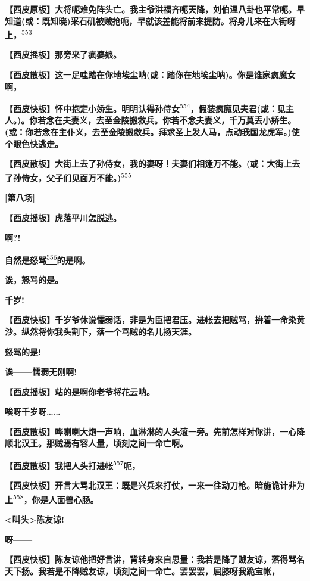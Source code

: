 \textbf{【西皮原板】大将呃难免阵头亡。我主爷洪福齐呃天降，刘伯温八卦也平常呃。早知道(或：既知晓)采石矶被贼抢呃，早就该差能将前来提防。将身儿来在大街呀上，}\protect\hyperlink{fn553}{\textsuperscript{553}}

\textbf{【西皮摇板】那旁来了疯婆娘。}

\textbf{【西皮散板】这一足哇踏在你地埃尘呐(或：踏你在地埃尘呐)。你是谁家疯魔女啊，}

\textbf{【西皮快板】怀中抱定小娇生。明明认得孙侍女}\protect\hyperlink{fn554}{\textsuperscript{554}}\textbf{，假装疯魔见夫君(或：见主人。)。你若念在夫妻义，去至金陵搬救兵。你若不念夫妻义，千万莫丢小娇生。(或：你若念在主仆义，去至金陵搬救兵。拜求圣上发人马，点动我国龙虎军。)使个眼色快逃走。}

\textbf{【西皮散板】大街上去了孙侍女，我的妻呀！夫妻们相逢万不能。(或：大街上去了孙侍女，父子们见面万不能。)}\protect\hyperlink{fn555}{\textsuperscript{555}}

\textbf{{[}第八场{]}}

\textbf{【西皮摇板】虎落平川怎脱逃。}

\textbf{啊?!}

\textbf{自然是怒骂}\protect\hyperlink{fn556}{\textsuperscript{556}}\textbf{的是啊。}

\textbf{诶，怒骂的是。}

\textbf{千岁!}

\textbf{【西皮快板】千岁爷休说懦弱话，非是为臣把君压。进帐去把贼骂，拚着一命染黄沙。纵然将你我头割下，落一个骂贼的名儿扬天涯。}

\textbf{怒骂的是!}

\textbf{诶------懦弱无刚啊!}

\textbf{【西皮摇板】站的是啊你老爷将花云呐。}

\textbf{唉呀千岁呀\ldots{}\ldots{}}

\textbf{【西皮散板】哗喇喇大炮一声响，血淋淋的人头滚一旁。先前怎样对你讲，一心降顺北汉王。那贼焉有容人量，顷刻之间一命亡啊。}

\textbf{【西皮散板】我把人头打进帐}\protect\hyperlink{fn557}{\textsuperscript{557}}\textbf{呃，}

\textbf{【西皮快板】开言大骂北汉王：既是兴兵来打仗，一来一往动刀枪。暗施诡计非为上}\protect\hyperlink{fn558}{\textsuperscript{558}}\textbf{，你是人面兽心肠。}

\textbf{\textless{}叫头\textgreater{}陈友谅!}

\textbf{呀------}

\textbf{【西皮快板】陈友谅他把好言讲，背转身来自思量：我若是降了贼友谅，落得骂名天下扬。我若是不降贼友谅，顷刻之间一命亡。罢罢罢，屈膝呀我跪宝帐，}

